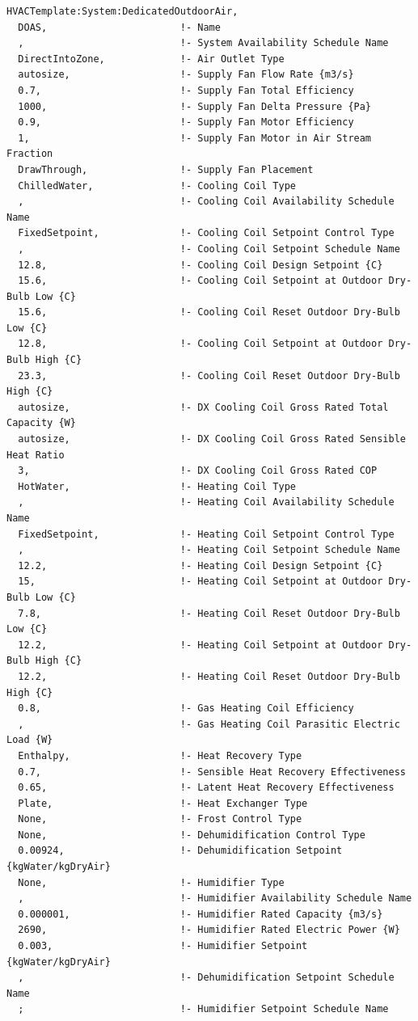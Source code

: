 \begin{lstlisting}
HVACTemplate:System:DedicatedOutdoorAir,
  DOAS,                       !- Name
  ,                           !- System Availability Schedule Name
  DirectIntoZone,             !- Air Outlet Type
  autosize,                   !- Supply Fan Flow Rate {m3/s}
  0.7,                        !- Supply Fan Total Efficiency
  1000,                       !- Supply Fan Delta Pressure {Pa}
  0.9,                        !- Supply Fan Motor Efficiency
  1,                          !- Supply Fan Motor in Air Stream Fraction
  DrawThrough,                !- Supply Fan Placement
  ChilledWater,               !- Cooling Coil Type
  ,                           !- Cooling Coil Availability Schedule Name
  FixedSetpoint,              !- Cooling Coil Setpoint Control Type
  ,                           !- Cooling Coil Setpoint Schedule Name
  12.8,                       !- Cooling Coil Design Setpoint {C}
  15.6,                       !- Cooling Coil Setpoint at Outdoor Dry-Bulb Low {C}
  15.6,                       !- Cooling Coil Reset Outdoor Dry-Bulb Low {C}
  12.8,                       !- Cooling Coil Setpoint at Outdoor Dry-Bulb High {C}
  23.3,                       !- Cooling Coil Reset Outdoor Dry-Bulb High {C}
  autosize,                   !- DX Cooling Coil Gross Rated Total Capacity {W}
  autosize,                   !- DX Cooling Coil Gross Rated Sensible Heat Ratio
  3,                          !- DX Cooling Coil Gross Rated COP
  HotWater,                   !- Heating Coil Type
  ,                           !- Heating Coil Availability Schedule Name
  FixedSetpoint,              !- Heating Coil Setpoint Control Type
  ,                           !- Heating Coil Setpoint Schedule Name
  12.2,                       !- Heating Coil Design Setpoint {C}
  15,                         !- Heating Coil Setpoint at Outdoor Dry-Bulb Low {C}
  7.8,                        !- Heating Coil Reset Outdoor Dry-Bulb Low {C}
  12.2,                       !- Heating Coil Setpoint at Outdoor Dry-Bulb High {C}
  12.2,                       !- Heating Coil Reset Outdoor Dry-Bulb High {C}
  0.8,                        !- Gas Heating Coil Efficiency
  ,                           !- Gas Heating Coil Parasitic Electric Load {W}
  Enthalpy,                   !- Heat Recovery Type
  0.7,                        !- Sensible Heat Recovery Effectiveness
  0.65,                       !- Latent Heat Recovery Effectiveness
  Plate,                      !- Heat Exchanger Type
  None,                       !- Frost Control Type
  None,                       !- Dehumidification Control Type
  0.00924,                    !- Dehumidification Setpoint {kgWater/kgDryAir}
  None,                       !- Humidifier Type
  ,                           !- Humidifier Availability Schedule Name
  0.000001,                   !- Humidifier Rated Capacity {m3/s}
  2690,                       !- Humidifier Rated Electric Power {W}
  0.003,                      !- Humidifier Setpoint {kgWater/kgDryAir}
  ,                           !- Dehumidification Setpoint Schedule Name
  ;                           !- Humidifier Setpoint Schedule Name
\end{lstlisting}

